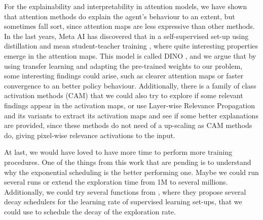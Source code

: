For the explainability and interpretability in attention models, we have shown that attention methods do explain the agent's behaviour to an extent, but sometimes fall sort, since attention maps are less expressive than other methods. In the last years, Meta AI has discovered that in a self-supervised set-up using distillation \cite{hinton2015distilling} and mean student-teacher training \cite{tarvainen2018mean}, where quite interesting properties emerge in the attention maps. This model is called DINO \cite{caron2021emerging}, and we argue that by using transfer learning and adapting the pre-trained weights to our problem, some interesting findings could arise, such as clearer attention maps or faster convergence to an better policy behaviour. Additionally, there is a family of class activation methods (CAM) \cite{layerCAM, fu2020axiombased, Chattopadhay_2018, Muhammad_2020} that we could also try to explore if some relevant findings appear in the activation maps, or use Layer-wise Relevance Propagation and its variants to extract its activation maps and see if some better explanations are provided, since these methods do not need of a up-scaling as CAM methods do, giving pixel-wise relevance activations to the input.

At last, we would have loved to have more time to perform more training procedures. One of the things from this work that are pending is to understand why the exponential scheduling is the better performing one. Maybe we could run several runs or extend the exploration time from 1M to several millions. Additionally, we could try several functions from \cite{zhang2022kdecay}, where they propose several decay schedulers for the learning rate of supervised learning set-ups, that we could use to schedule the decay of the exploration rate.